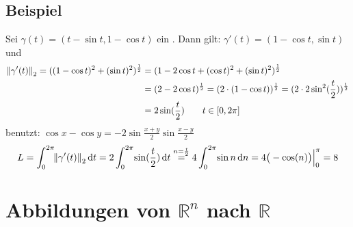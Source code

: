 \subsection[Beispiel: Länge eines Zykloids]{Beispiel} %
\label{sub:511}
Sei $\gamma(t)= (t- \sin t , 1-  \cos t  )$ ein . Dann gilt: $\gamma'(t) = (1- \cos t , \sin t )$ und 
\begin{align*}
	\norm[2]{\gamma'(t)}  = \enbrace{ (1- \cos t)^2 + (\sin t)^2}^{\frac{1}{2} } &= \enbrace{1- 2 \cos t + (\cos t)^2 + (\sin t)^2}^{\frac{1}{2}}  \\
	&= (2-2 \cos t)^{\frac{1}{2} } = ( 2 \cdot  (1- \cos t))^{\frac{1}{2}} = \enbrace{2 \cdot 2 \sin^2 \enbrace{\frac{t}{2}}}^{\frac{1}{2} } \\
	&= 2 \sin \enbrace{\frac{t}{2}} \tag*{$t \in [0, 2\pi ]$}
\end{align*}
benutzt: $\cos x - \cos y = -2 \sin \frac{x+y}{2} \sin \frac{x-y}{2}  $
\begin{align*}
	L= \int_{0} ^{2 \pi } \! \norm[2]{\gamma'(t)}  \, \mathrm{d}t = 2 \int_{0} ^{2 \pi } \! \sin \enbrace{\frac{t}{2}}   \, \mathrm{d}t \stackrel{n=\frac{t}{2} }{=} 
	4 \int_{0} ^{2 \pi } \! \sin n  \, \mathrm{d}n = 4 \big(- \cos (n) \big) \Big|_0^\pi  = 8      
\end{align*}
\newpage
\section{Abbildungen von $\mathds{R}^n$ nach $\mathds{R}$} %
\label{sec:6}
\begin{figure}[ht]
\end{figure}


